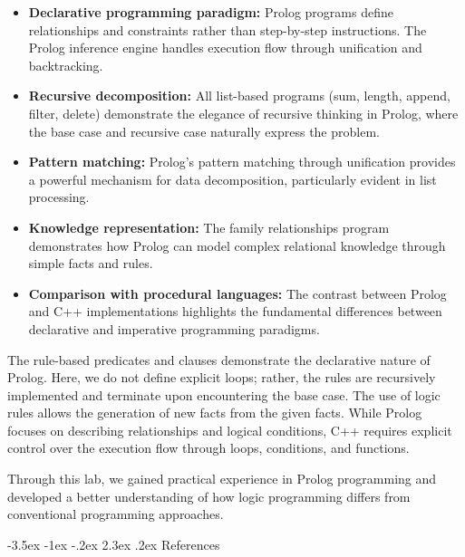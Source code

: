 \documentclass[12pt,a4paper]{article}
\makeatletter
\renewcommand{\section}{\@startsection{section}{1}{\z@}%
  {-3.5ex \@plus -1ex \@minus -.2ex}%
  {2.3ex \@plus.2ex}%
  {\normalfont\Large\bfseries}}
\makeatother
\begin{document}
\begin{itemize}
    \item \textbf{Declarative programming paradigm:} Prolog programs define relationships and constraints rather than step-by-step instructions. The Prolog inference engine handles execution flow through unification and backtracking.

    \item \textbf{Recursive decomposition:} All list-based programs (sum, length, append, filter, delete) demonstrate the elegance of recursive thinking in Prolog, where the base case and recursive case naturally express the problem.

    \item \textbf{Pattern matching:} Prolog's pattern matching through unification provides a powerful mechanism for data decomposition, particularly evident in list processing.

    \item \textbf{Knowledge representation:} The family relationships program demonstrates how Prolog can model complex relational knowledge through simple facts and rules.

    \item \textbf{Comparison with procedural languages:} The contrast between Prolog and C++ implementations highlights the fundamental differences between declarative and imperative programming paradigms.
\end{itemize}

The rule-based predicates and clauses demonstrate the declarative nature of Prolog. Here, we do not define explicit loops; rather, the rules are recursively implemented and terminate upon encountering the base case. The use of logic rules allows the generation of new facts from the given facts. While Prolog focuses on describing relationships and logical conditions, C++ requires explicit control over the execution flow through loops, conditions, and functions.

Through this lab, we gained practical experience in Prolog programming and developed a better understanding of how logic programming differs from conventional programming approaches.

\section{References}
\end{document}
